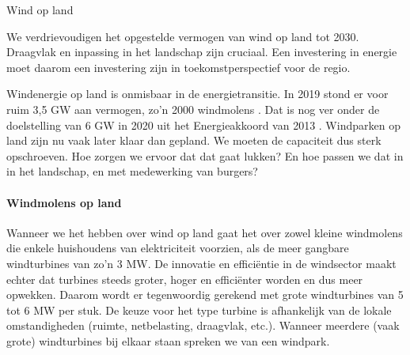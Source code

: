 \begin{voorstel}{Wind op land}


\begin{samenvatting}
We verdrievoudigen het opgestelde vermogen van wind op land tot 2030. Draagvlak en inpassing in het landschap zijn cruciaal. Een investering in energie moet daarom een investering zijn in toekomstperspectief voor de regio.
\end{samenvatting}

\begin{multicols}{2}

\begin{uitdaging}
Windenergie op land is onmisbaar in de energietransitie. In 2019 stond er voor ruim 3,5 GW aan vermogen, zo’n 2000 windmolens \parencite{cbs_statline_nodate}. Dat is nog ver onder de doelstelling van 6 GW in 2020 uit het Energieakkoord van 2013 \parencite{rijksoverheid_windenergie_2016}. Windparken op land zijn nu vaak later klaar dan gepland. We moeten de capaciteit dus sterk opschroeven. Hoe zorgen we ervoor dat dat gaat lukken? En hoe passen we dat in in het landschap, en met medewerking van burgers?
\end{uitdaging}

\begin{overwegingen}
\paragraph{Windmolens op land}
Wanneer we het hebben over wind op land gaat het over zowel kleine windmolens die enkele huishoudens van elektriciteit voorzien, als de meer gangbare windturbines van zo'n 3 MW. De innovatie en efficiëntie in de windsector maakt echter dat turbines steeds groter, hoger en efficiënter worden en dus meer opwekken. Daarom wordt er tegenwoordig gerekend met grote windturbines van 5 tot 6 MW per stuk. De keuze voor het type turbine is afhankelijk van de lokale omstandigheden (ruimte, netbelasting, draagvlak, etc.). Wanneer meerdere (vaak grote) windturbines bij elkaar staan spreken we van een windpark.


\end{overwegingen}
\end{multicols}
\end{voorstel}
